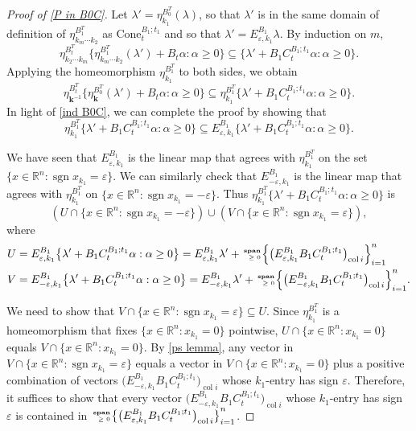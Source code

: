 \documentclass{amsart}
\theoremstyle{definition}
\theoremstyle{remark}
\numberwithin{equation}{section}
\newcommand{\reals}{\mathbb R}
\newcommand{\ep}{\varepsilon}
\newcommand{\col}{\operatorname{col}}
\newcommand{\sgn}{\operatorname{sgn}}
\newcommand{\nnspan}{{\!\!\tiny\begin{array}{r}\mathbf{span}\\\ge0\end{array}\hspace*{-0.57em}}}
\newcommand{\set}[1]{{\lbrace #1 \rbrace}}
\newcommand{\sett}[1]{{\bigl\lbrace #1 \bigr\rbrace}}
\newcommand{\settt}[1]{{\Bigl\lbrace #1 \Bigr\rbrace}}
\newcommand{\0}{{\mathbf{0}}}
\newcommand{\Cone}{\mathrm{Cone}}
\newcommand{\kk}{{\boldsymbol{k}}}
\begin{document}
\begin{proof}[Proof of \cref{P in B0C}]
Let $\lambda'=\eta_{k_1}^{B_0^T}(\lambda)$, so that $\lambda'$ is in the same domain of definition of $\eta_{k_m\cdots k_2}^{B_1^T}$ as $\Cone_t^{B_1;t_1}$ and so that $\lambda'=E^{B_1}_{\ep,k_1}\lambda$.
By induction on $m$, 
\[\eta_{k_2\cdots k_m}^{B_t^T}\set{\eta_{k_m\cdots k_2}^{B_1^T}(\lambda')+B_t\alpha:\alpha\ge0}\subseteq\set{\lambda'+B_1C_t^{B_1;t_1}\alpha:\alpha\ge0}.\]
Applying the homeomorphism $\eta_{k_1}^{B_1^T}$ to both sides, we obtain
\[\eta_{\kk^{-1}}^{B_t^T}\set{\eta_\kk^{B_0^T}(\lambda')+B_t\alpha:\alpha\ge0}\subseteq\eta_{k_1}^{B_1^T}\set{\lambda'+B_1C_t^{B_1;t_1}\alpha:\alpha\ge0}.\]
In light of \eqref{ind B0C}, we can complete the proof by showing that
\[\eta_{k_1}^{B_1^T}\sett{\lambda'+B_1C_t^{B_1;t_1}\alpha:\alpha\ge0}\subseteq E^{B_1}_{\ep,k_1}\sett{\lambda'+B_1C_t^{B_1;t_1}\alpha:\alpha\ge0}.\]

We have seen that $E^{B_1}_{\ep,k_1}$ is the linear map that agrees with $\eta_{k_1}^{B_1^T}$ on the set $\set{x\in\reals^n:\sgn x_{k_1}=\ep}$.
We can similarly check that $E^{B_1}_{-\ep,k_1}$ is the linear map that agrees with $\eta_{k_1}^{B_1^T}$ on $\set{x\in\reals^n:\sgn x_{k_1}=-\ep}$.
Thus $\eta_{k_1}^{B_1^T}\set{\lambda'+B_1C_t^{B_1;t_1}\alpha:\alpha\ge0}$ is
\[(U\cap\set{x\in\reals^n:\sgn x_{k_1}=-\ep})\cup(V\cap\set{x\in\reals^n:\sgn x_{k_1}=\ep}),\]
where %
{\small
\begin{align*}
U&=E^{B_1}_{\ep,k_1}\sett{\lambda'+B_1C_t^{B_1;t_1}\alpha:\alpha\ge0}=E^{B_1}_{\ep,k_1}\lambda'+\nnspan\settt{\bigl(E^{B_1}_{\ep,k_1}B_1C_t^{B_1;t_1}\bigr)_{\col i}}_{i=1}^n\\
V&=E^{B_1}_{-\ep,k_1}\sett{\lambda'+B_1C_t^{B_1;t_1}\alpha:\alpha\ge0}=E^{B_1}_{-\ep,k_1}\lambda'+\nnspan\settt{\bigl(E^{B_1}_{-\ep,k_1}B_1C_t^{B_1;t_1}\bigr)_{\col i}}_{i=1}^n.
\end{align*}
}

We need to show that $V\cap\set{x\in\reals^n:\sgn x_{k_1}=\ep}\subseteq U$.
Since $\eta_{k_1}^{B_1^T}$ is a homeomorphism that fixes $\set{x\in\reals^n:x_{k_1}=0}$ pointwise, $U\cap\set{x\in\reals^n:x_{k_1}=0}$ equals $V\cap\set{x\in\reals^n:x_{k_1}=0}$.
By \cref{ps lemma}, any vector in $V\cap\set{x\in\reals^n:\sgn x_{k_1}=\ep}$ equals a vector in $V\cap\set{x\in\reals^n:x_{k_1}=0}$ plus a positive combination of vectors $\bigl(E^{B_1}_{-\ep,k_1}B_1C_t^{B_1;t_1}\bigr)_{\col i}$ whose $k_1$-entry has sign $\ep$.
Therefore, it suffices to show that every vector $\bigl(E^{B_1}_{-\ep,k_1}B_1C_t^{B_1;t_1}\bigr)_{\col i}$ whose $k_1$-entry has sign~$\ep$ is contained in $\nnspan\sett{\bigl(E^{B_1}_{\ep,k_1}B_1C_t^{B_1;t_1}\bigr)_{\col i}}_{i=1}^n$.


\end{proof}
\end{document}
